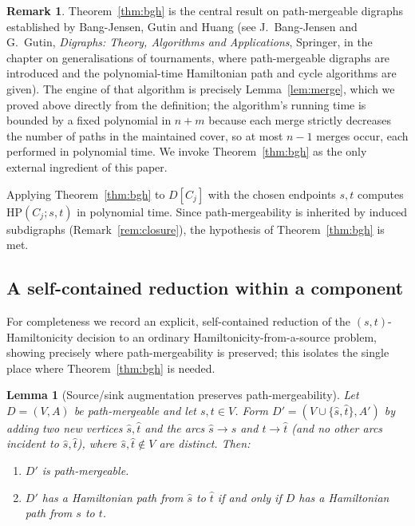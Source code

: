 \documentclass[12pt]{article}
\newtheorem{lemma}{Lemma}
\theoremstyle{definition}
\newtheorem{remark}{Remark}
\newcommand{\Vv}{V}
\newcommand{\Aa}{A}
\begin{document}
\begin{remark}
Theorem~\ref{thm:bgh} is the central result on path-mergeable digraphs
established by Bang-Jensen, Gutin and Huang (see J.~Bang-Jensen and G.~Gutin,
\emph{Digraphs: Theory, Algorithms and Applications}, Springer, in the chapter on
generalisations of tournaments, where path-mergeable digraphs are introduced and
the polynomial-time Hamiltonian path and cycle algorithms are given). The engine of
that algorithm is precisely Lemma~\ref{lem:merge}, which we proved above directly
from the definition; the algorithm's running time is bounded by a fixed polynomial
in $n+m$ because each merge strictly decreases the number of paths in the
maintained cover, so at most $n-1$ merges occur, each performed in polynomial time.
We invoke Theorem~\ref{thm:bgh} as the only external ingredient of this paper.
\end{remark}

Applying Theorem~\ref{thm:bgh} to $D[C_{j}]$ with the chosen endpoints $s,t$
computes $\mathrm{HP}(C_{j};s,t)$ in polynomial time. Since path-mergeability is
inherited by induced subdigraphs (Remark~\ref{rem:closure}), the hypothesis of
Theorem~\ref{thm:bgh} is met.

\subsection{A self-contained reduction within a component}\label{sec:selfcontained}

For completeness we record an explicit, self-contained reduction of the
$(s,t)$-Hamiltonicity decision to an ordinary Hamiltonicity-from-a-source problem,
showing precisely where path-mergeability is preserved; this isolates the single
place where Theorem~\ref{thm:bgh} is needed.

\begin{lemma}[Source/sink augmentation preserves path-mergeability]\label{lem:source}
Let $D=(\Vv,\Aa)$ be path-mergeable and let $s,t\in\Vv$. Form
$D'=(\Vv\cup\{\hat s,\hat t\},\Aa')$ by adding two new vertices $\hat s,\hat t$ and
the arcs $\hat s\to s$ and $t\to\hat t$ (and no other arcs incident to
$\hat s,\hat t$), where $\hat s,\hat t\notin\Vv$ are distinct. Then:
\begin{enumerate}
\item $D'$ is path-mergeable.
\item $D'$ has a Hamiltonian path from $\hat s$ to $\hat t$ if and only if $D$ has
a Hamiltonian path from $s$ to $t$.
\end{enumerate}
\end{lemma}
\end{document}
